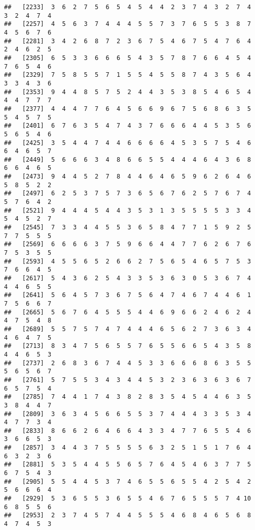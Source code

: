 \documentclass[
]{book}
\begin{document}
\begin{verbatim}
##   [2233]  3  6  2  7  5  6  5  4  5  4  4  2  3  7  4  3  2  7  4  3  2  4  7  4
##   [2257]  4  5  6  3  7  4  4  4  5  5  7  3  7  6  5  5  3  8  7  4  5  6  7  6
##   [2281]  3  4  2  6  8  7  2  3  6  7  5  4  6  7  5  4  7  6  4  2  4  6  2  5
##   [2305]  6  5  3  3  6  6  6  5  4  3  5  7  8  7  6  6  4  5  4  7  6  5  4  6
##   [2329]  7  5  8  5  5  7  1  5  5  4  5  5  8  7  4  3  5  6  4  3  3  4  3  6
##   [2353]  9  4  4  8  5  7  5  2  4  4  3  5  3  8  5  4  6  5  4  4  4  7  7  7
##   [2377]  4  4  4  7  7  6  4  5  6  6  9  6  7  5  6  8  6  3  5  5  4  5  7  5
##   [2401]  6  7  6  3  5  4  7  4  3  7  6  6  6  4  4  5  3  5  6  5  6  5  4  6
##   [2425]  3  5  4  4  7  4  4  6  6  6  6  4  5  3  5  7  5  4  6  6  4  6  5  7
##   [2449]  5  6  6  6  3  4  8  6  6  5  5  4  4  4  6  4  3  6  8  6  6  4  6  5
##   [2473]  9  4  4  5  2  7  8  4  4  6  4  6  5  9  6  2  6  4  6  5  8  5  2  2
##   [2497]  6  2  5  3  7  5  7  3  6  5  6  7  6  2  5  7  6  7  4  5  7  6  4  2
##   [2521]  9  4  4  4  5  4  4  3  5  3  1  3  5  5  5  5  3  3  4  5  4  5  2  7
##   [2545]  7  3  3  4  4  5  5  3  6  5  8  4  7  7  1  5  9  2  5  7  7  5  5  5
##   [2569]  6  6  6  6  3  7  5  9  6  6  4  4  7  7  6  2  6  7  6  7  5  3  5  5
##   [2593]  4  5  5  6  5  2  6  6  2  7  5  6  5  4  6  5  7  5  3  7  6  6  4  5
##   [2617]  5  4  3  6  2  5  4  3  3  5  3  6  3  0  5  3  6  7  4  4  4  6  5  5
##   [2641]  5  6  4  5  7  3  6  7  5  6  4  7  4  6  7  4  4  6  1  7  5  6  6  7
##   [2665]  5  6  7  6  4  5  5  5  4  4  6  9  6  6  2  4  6  2  4  4  7  5  4  8
##   [2689]  5  5  7  5  7  4  7  4  4  4  6  5  6  2  7  3  6  3  4  4  6  4  7  5
##   [2713]  8  3  4  7  5  6  5  5  7  6  5  5  6  6  5  4  3  5  8  4  4  6  5  3
##   [2737]  2  6  8  3  6  7  4  4  5  3  3  6  6  6  8  6  3  5  5  5  6  5  6  7
##   [2761]  5  7  5  5  3  4  3  4  4  5  3  2  3  6  3  6  3  6  7  6  5  7  5  4
##   [2785]  7  4  4  1  7  4  3  8  2  8  3  5  4  5  4  4  6  3  5  3  8  4  4  7
##   [2809]  3  6  3  4  5  6  6  5  5  3  7  4  4  4  3  3  5  3  4  4  7  7  3  4
##   [2833]  8  6  6  2  6  4  6  6  4  3  3  4  7  7  6  5  5  4  6  3  6  6  5  3
##   [2857]  3  4  4  3  7  5  5  5  5  6  3  2  5  1  5  1  7  6  4  6  3  2  3  6
##   [2881]  5  3  5  4  4  5  5  6  5  7  6  4  5  4  6  3  7  7  5  6  7  5  4  3
##   [2905]  5  5  4  4  5  3  7  4  6  5  5  6  5  5  4  2  5  4  2  5  6  6  6  4
##   [2929]  5  3  6  5  5  3  6  5  5  4  6  7  6  5  5  5  7  4 10  6  8  5  5  6
##   [2953]  2  3  7  4  5  7  4  4  5  5  5  4  6  8  4  6  5  6  8  4  7  4  5  3

\end{verbatim}
\end{document}
